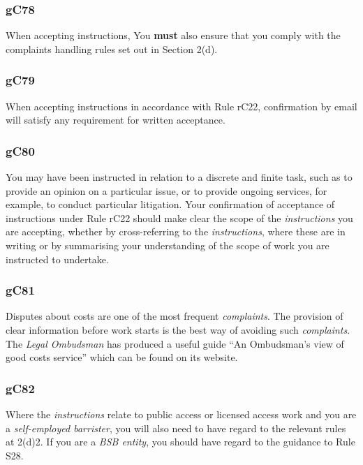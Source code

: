 \subsubsection{\color{darkgrey}gC78}

When accepting instructions, You \textcolor{myred}{\textbf{must}} also ensure that you comply with
the complaints handling rules set out in Section 2(d).

\subsubsection{\color{darkgrey}gC79}

When accepting instructions in accordance with Rule rC22, confirmation
by email will satisfy any requirement for written acceptance.

\subsubsection{\color{darkgrey}gC80}

You may have been instructed in relation to a discrete and finite task,
such as to provide an opinion on a particular issue, or to provide
ongoing services, for example, to conduct particular litigation. Your
confirmation of acceptance of instructions under Rule rC22 should make
clear the scope of the \emph{instructions} you are accepting, whether by
cross-referring to the \emph{instructions}, where these are in writing
or by summarising your understanding of the scope of work you are
instructed to undertake.

\subsubsection{\color{darkgrey}gC81}

Disputes about costs are one of the most frequent \emph{complaints}. The
provision of clear information before work starts is the best way of
avoiding such \emph{complaints}. The \emph{Legal Ombudsman} has produced
a useful guide ``An Ombudsman's view of good costs service'' which can
be found on its website.

\subsubsection{\color{darkgrey}gC82}

Where the \emph{instructions} relate to public access or licensed access
work and you are a \emph{self-employed barrister}, you will also need to
have regard to the relevant rules at 2(d)2. If you are a \emph{BSB
entity}, you should have regard to the guidance to Rule S28.

